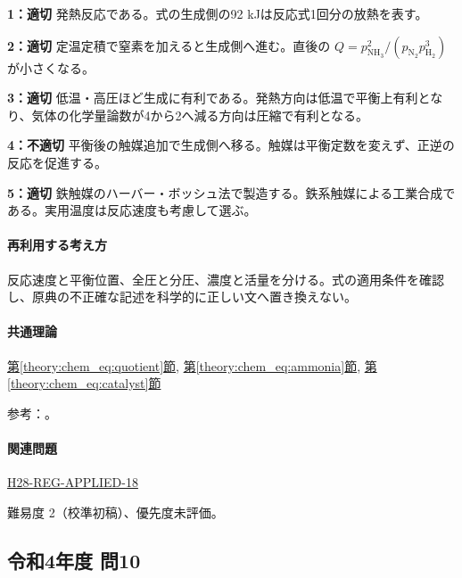 \noindent\textbf{1：適切} 発熱反応である。式の生成側の92 kJは反応式1回分の放熱を表す。\par

\noindent\textbf{2：適切} 定温定積で窒素を加えると生成側へ進む。直後の \(Q=p_{\mathrm{NH_3}}^2/(p_{\mathrm{N_2}}p_{\mathrm{H_2}}^3)\) が小さくなる。\par

\noindent\textbf{3：適切} 低温・高圧ほど生成に有利である。発熱方向は低温で平衡上有利となり、気体の化学量論数が4から2へ減る方向は圧縮で有利となる。\par

\noindent\textbf{4：不適切} 平衡後の触媒追加で生成側へ移る。触媒は平衡定数を変えず、正逆の反応を促進する。\par

\noindent\textbf{5：適切} 鉄触媒のハーバー・ボッシュ法で製造する。鉄系触媒による工業合成である。実用温度は反応速度も考慮して選ぶ。\par

\paragraph{再利用する考え方} 反応速度と平衡位置、全圧と分圧、濃度と活量を分ける。式の適用条件を確認し、原典の不正確な記述を科学的に正しい文へ置き換えない。

\paragraph{共通理論} \hyperref[theory:chem_eq:quotient]{第\ref*{theory:chem_eq:quotient}節}, \hyperref[theory:chem_eq:ammonia]{第\ref*{theory:chem_eq:ammonia}節}, \hyperref[theory:chem_eq:catalyst]{第\ref*{theory:chem_eq:catalyst}節}

\par 参考：\cite{iupac_greenbook2012}。

\paragraph{関連問題} \hyperref[q:h28-reg-applied-18]{H28-REG-APPLIED-18}

\par 難易度 2（校準初稿）、優先度未評価。

\subsection{令和4年度 問10}
\label{q:r04-reg-applied-10}

